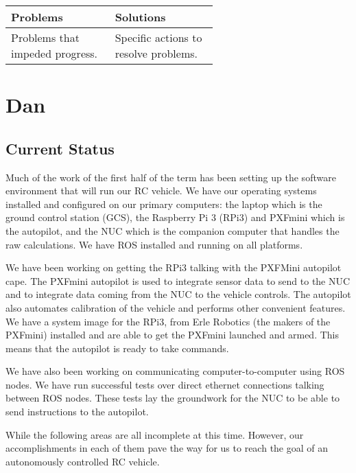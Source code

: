 \documentclass[compsoc,draftclsnofoot,onecolumn,10pt]{IEEEtran}
\begin{document}
\begin{tabular}{|p{0.3\linewidth}|p{0.3\linewidth}|}
	\hline
	\textbf{Problems} & \textbf{Solutions}\\
	\hline
	Problems that impeded progress. & Specific actions to resolve problems.\\
	\hline
	
\end{tabular}

\section{Dan}
\subsection{Current Status}
Much of the work of the first half of the term has been setting up the software environment that will run our RC vehicle.
We have our operating systems installed and configured on our primary computers: the laptop which is the ground control station (GCS), the Raspberry Pi 3 (RPi3) and PXFmini which is the autopilot, and the NUC which is the companion computer that handles the raw calculations. We have ROS installed and running on all platforms.\par

We have been working on getting the RPi3 talking with the PXFMini autopilot cape. The PXFmini autopilot is used to integrate sensor data to send to the NUC and to integrate data coming from the NUC to the vehicle controls. The autopilot also automates calibration of the vehicle and performs other convenient features. We have a system image for the RPi3, from Erle Robotics (the makers of the PXFmini) installed and are able to get the PXFmini launched and armed. This means that the autopilot is ready to take commands.\par

We have also been working on communicating computer-to-computer using ROS nodes. We have run successful tests over direct ethernet connections talking between ROS nodes. These tests lay the groundwork for the NUC to be able to send instructions to the autopilot.\par

While the following areas are all incomplete at this time. However, our accomplishments in each of them pave the way for us to reach the goal of an autonomously controlled RC vehicle.\par
\end{document}

